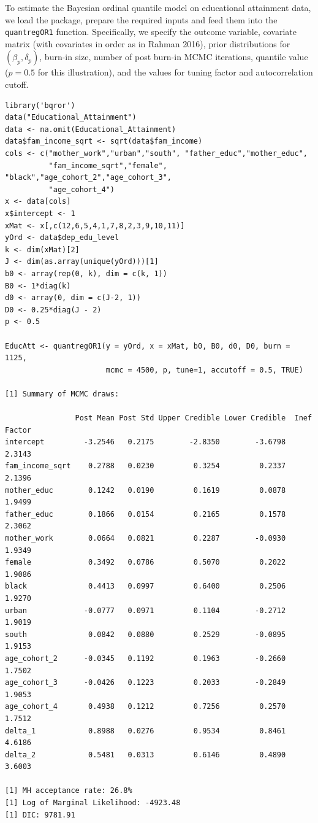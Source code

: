 To estimate the Bayesian ordinal quantile model on educational attainment data, we load the  package, prepare the required inputs and feed them into the \texttt{quantregOR1} function. Specifically, we specify the outcome variable, covariate matrix (with covariates in order as in Rahman 2016), prior distributions for \((\beta_{p}, \delta_{p})\), burn-in size, number of post burn-in MCMC iterations, quantile value (\(p=0.5\) for this illustration), and the values for tuning factor and autocorrelation cutoff.

\begin{verbatim}
library('bqror')
data("Educational_Attainment")
data <- na.omit(Educational_Attainment)
data$fam_income_sqrt <- sqrt(data$fam_income)
cols <- c("mother_work","urban","south", "father_educ","mother_educ",
          "fam_income_sqrt","female", "black","age_cohort_2","age_cohort_3",
          "age_cohort_4")
x <- data[cols]
x$intercept <- 1
xMat <- x[,c(12,6,5,4,1,7,8,2,3,9,10,11)]
yOrd <- data$dep_edu_level
k <- dim(xMat)[2]
J <- dim(as.array(unique(yOrd)))[1]
b0 <- array(rep(0, k), dim = c(k, 1))
B0 <- 1*diag(k)
d0 <- array(0, dim = c(J-2, 1))
D0 <- 0.25*diag(J - 2)
p <- 0.5

EducAtt <- quantregOR1(y = yOrd, x = xMat, b0, B0, d0, D0, burn = 1125,
                       mcmc = 4500, p, tune=1, accutoff = 0.5, TRUE)

[1] Summary of MCMC draws:

                Post Mean Post Std Upper Credible Lower Credible  Inef Factor
intercept         -3.2546   0.2175        -2.8350        -3.6798       2.3143
fam_income_sqrt    0.2788   0.0230         0.3254         0.2337       2.1396
mother_educ        0.1242   0.0190         0.1619         0.0878       1.9499
father_educ        0.1866   0.0154         0.2165         0.1578       2.3062
mother_work        0.0664   0.0821         0.2287        -0.0930       1.9349
female             0.3492   0.0786         0.5070         0.2022       1.9086
black              0.4413   0.0997         0.6400         0.2506       1.9270
urban             -0.0777   0.0971         0.1104        -0.2712       1.9019
south              0.0842   0.0880         0.2529        -0.0895       1.9153
age_cohort_2      -0.0345   0.1192         0.1963        -0.2660       1.7502
age_cohort_3      -0.0426   0.1223         0.2033        -0.2849       1.9053
age_cohort_4       0.4938   0.1212         0.7256         0.2570       1.7512
delta_1            0.8988   0.0276         0.9534         0.8461       4.6186
delta_2            0.5481   0.0313         0.6146         0.4890       3.6003

[1] MH acceptance rate: 26.8%
[1] Log of Marginal Likelihood: -4923.48
[1] DIC: 9781.91
\end{verbatim}


